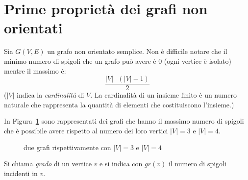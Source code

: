 \section{Prime proprietà dei grafi non orientati}

Sia $G(V,E)$ un grafo non orientato semplice.
Non è difficile notare che il minimo numero di spigoli che un grafo può avere è $0$ (ogni vertice è isolato) mentre il massimo è:
\[ \frac{|V|\text{ }(|V|-1)}{2} \]
($|V|$ indica la \emph{cardinalità} di $V$. La cardinalità di un insieme finito è un numero naturale che rappresenta la quantità di elementi che costituiscono l'insieme.)
\begin{ese} In Figura~\ref{fig:card} sono rappresentati dei grafi che hanno il massimo
numero di spigoli che è possibile avere rispetto al numero dei loro vertici $|V| = 3$ e $|V| = 4$.
\begin{figure}[H]		
    \centering
        \hspace{1cm}
        \caption{due grafi rispettivamente con $|V| = 3$ e $|V| = 4$} \label{fig:card}
    \end{figure}
\end{ese}

\begin{defn} Si chiama \emph{grado} di un vertice $v$ e si indica con $gr(v)$ il
numero di spigoli incidenti in $v$.
\end{defn}

